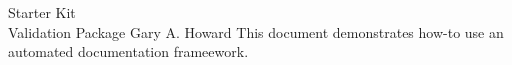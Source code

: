 \documentclass[10pt]{tlc-article}
\begin{document}
  \tlcTitlePageAndTableOfContents
    {Starter Kit \\ Validation Package}
    {Gary A. Howard}
    {This document demonstrates how-to use an automated documentation
      frameework.} 
  
\end{document}
